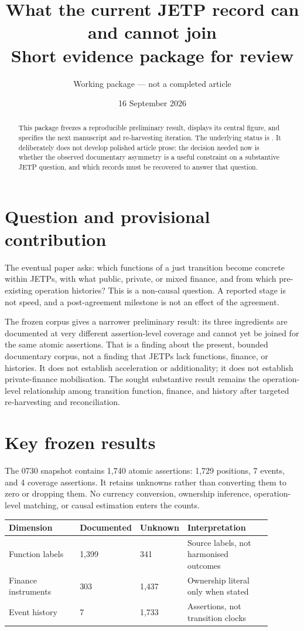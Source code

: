 \documentclass[11pt]{article}
\title{What the current JETP record can and cannot join\\
\large Short evidence package for review}
\author{Working package --- not a completed article}
\date{16 September 2026}
\begin{document}
\maketitle

\begin{abstract}
This package freezes a reproducible preliminary result, displays its central
figure, and specifies the next manuscript and re-harvesting iteration. The
underlying status is \JetpDataStatus. It deliberately does not develop polished
article prose: the decision needed now is whether the observed documentary
asymmetry is a useful constraint on a substantive JETP question, and which
records must be recovered to answer that question.
\end{abstract}

\section*{Question and provisional contribution}
The eventual paper asks: which functions of a just transition become concrete
within JETPs, with what public, private, or mixed finance, and from which
pre-existing operation histories? This is a non-causal question. A reported
stage is not speed, and a post-agreement milestone is not an effect of the
agreement.

The frozen corpus gives a narrower preliminary result: its three ingredients
are documented at very different assertion-level coverage and cannot yet be
joined for the same atomic assertions. That is a finding about the present,
bounded documentary corpus, not a finding that JETPs lack functions, finance,
or histories. It does not establish acceleration or additionality; it does not establish private-finance mobilisation. The sought substantive result remains
the operation-level relationship among transition function, finance, and
history after targeted re-harvesting and reconciliation.

\section*{Key frozen results}
The 0730 snapshot contains 1,740 atomic assertions: 1,729 positions, 7 events,
and 4 coverage assertions. It retains unknowns rather than converting them to
zero or dropping them. No currency conversion, ownership inference,
operation-level matching, or causal estimation enters the counts.

\begin{center}
\begin{tabular}{@{}p{0.27\linewidth}p{0.15\linewidth}p{0.15\linewidth}p{0.32\linewidth}@{}}
\toprule
Dimension & Documented & Unknown & Interpretation \\
\midrule
Function labels & 1,399 & 341 & Source labels, not harmonised outcomes \\
Finance instruments & 303 & 1,437 & Ownership literal only when stated \\
Event history & 7 & 1,733 & Assertions, not transition clocks \\
\bottomrule
\end{tabular}
\end{center}
\end{document}
